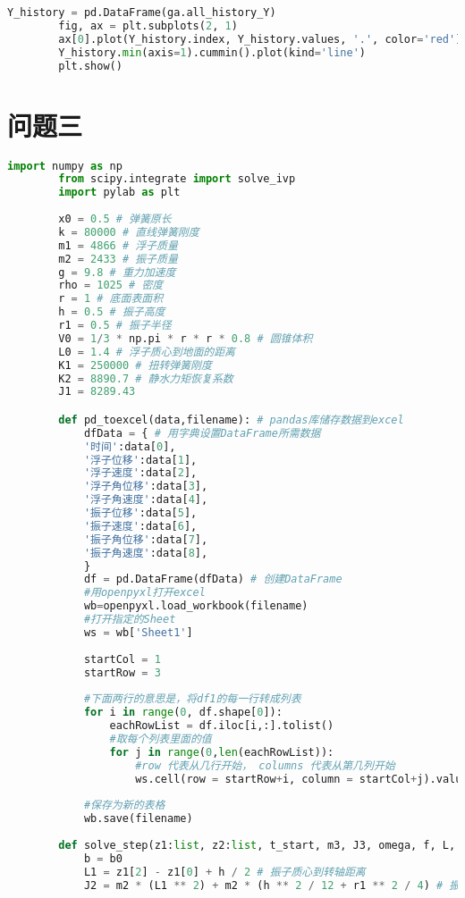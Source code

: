 \documentclass[withoutpreface,bwprint]{cumcmthesis} %
\begin{document}
\begin{appendices}
\begin{lstlisting}[language=python]
        Y_history = pd.DataFrame(ga.all_history_Y)
        fig, ax = plt.subplots(2, 1)
        ax[0].plot(Y_history.index, Y_history.values, '.', color='red')
        Y_history.min(axis=1).cummin().plot(kind='line')
        plt.show()
        \end{lstlisting}   

        \section{问题三}
        \begin{lstlisting}[language=python]
        import numpy as np
        from scipy.integrate import solve_ivp
        import pylab as plt
        
        x0 = 0.5 # 弹簧原长
        k = 80000 # 直线弹簧刚度
        m1 = 4866 # 浮子质量
        m2 = 2433 # 振子质量
        g = 9.8 # 重力加速度
        rho = 1025 # 密度
        r = 1 # 底面表面积
        h = 0.5 # 振子高度
        r1 = 0.5 # 振子半径
        V0 = 1/3 * np.pi * r * r * 0.8 # 圆锥体积
        L0 = 1.4 # 浮子质心到地面的距离
        K1 = 250000 # 扭转弹簧刚度
        K2 = 8890.7 # 静水力矩恢复系数
        J1 = 8289.43

        def pd_toexcel(data,filename): # pandas库储存数据到excel
            dfData = { # 用字典设置DataFrame所需数据
            '时间':data[0],
            '浮子位移':data[1],
            '浮子速度':data[2],
            '浮子角位移':data[3],
            '浮子角速度':data[4],
            '振子位移':data[5],
            '振子速度':data[6],
            '振子角位移':data[7],
            '振子角速度':data[8],
            }
            df = pd.DataFrame(dfData) # 创建DataFrame
            #用openpyxl打开excel
            wb=openpyxl.load_workbook(filename)
            #打开指定的Sheet
            ws = wb['Sheet1']
            
            startCol = 1
            startRow = 3
            
            #下面两行的意思是，将df1的每一行转成列表
            for i in range(0, df.shape[0]):
                eachRowList = df.iloc[i,:].tolist()
                #取每个列表里面的值
                for j in range(0,len(eachRowList)):
                    #row 代表从几行开始， columns 代表从第几列开始
                    ws.cell(row = startRow+i, column = startCol+j).value =eachRowList[j]
            
            #保存为新的表格
            wb.save(filename)
        
        def solve_step(z1:list, z2:list, t_start, m3, J3, omega, f, L, b1:float, B1:float, b0:float, B0:float)->list:
            b = b0
            L1 = z1[2] - z1[0] + h / 2 # 振子质心到转轴距离
            J2 = m2 * (L1 ** 2) + m2 * (h ** 2 / 12 + r1 ** 2 / 4) # 振子的转动惯量
        

\end{lstlisting}
\end{appendices}
\end{document}
